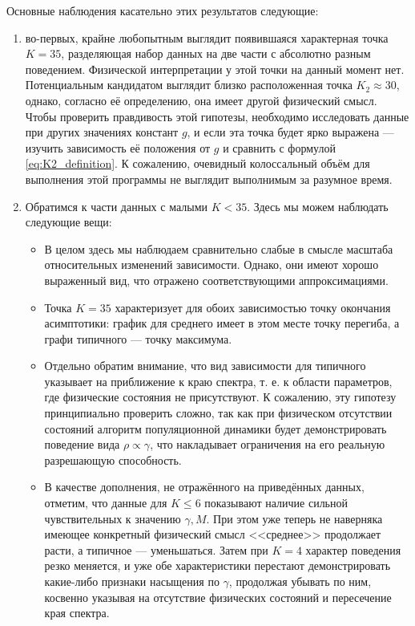 Основные наблюдения касательно этих результатов следующие:
\begin{enumerate}
	\item во-первых, крайне любопытным выглядит появившаяся характерная точка $K = 35$, разделяющая набор данных на две части с абсолютно разным поведением. Физической интерпретации у этой точки на данный момент нет. Потенциальным кандидатом выглядит близко расположенная точка $K_2 \approx 30$, однако, согласно её определению, она имеет другой физический смысл. Чтобы проверить правдивость этой гипотезы, необходимо исследовать данные при других значениях констант $g$, и если эта точка будет ярко выражена --- изучить зависимость её положения от $g$ и сравнить с формулой \eqref{eq:K2_definition}. К сожалению, очевидный колоссальный объём для выполнения этой программы не выглядит выполнимым за разумное время.
	\item Обратимся к части данных с малыми $K < 35$. Здесь мы можем наблюдать следующие вещи:
	\begin{itemize}
		\item В целом здесь мы наблюдаем сравнительно слабые в смысле масштаба относительных изменений зависимости. Однако, они имеют хорошо выраженный вид, что отражено соответствующими аппроксимациями.
		\item Точка $K = 35$ характеризует для обоих зависимостью точку окончания асимптотики: график для среднего имеет в этом месте точку перегиба, а графи типичного --- точку максимума.
		\item Отдельно обратим внимание, что вид зависимости для типичного указывает на приближение к краю спектра, т. е. к области параметров, где физические состояния не присутствуют. К сожалению, эту гипотезу принципиально проверить сложно, так как при физическом отсутствии состояний алгоритм популяционной динамики будет демонстрировать поведение вида $\rho \propto \gamma$, что накладывает ограничения на его реальную разрешающую способность.  
		\item В качестве дополнения, не отражённого на приведённых данных, отметим, что данные для $K \le 6$ показывают наличие сильной чувствительных к значению $\gamma, M$. При этом уже теперь не наверняка имеющее конкретный физический смысл <<среднее>> продолжает расти, а типичное --- уменьшаться. Затем при $K = 4$ характер поведения резко меняется, и уже обе характеристики перестают демонстрировать какие-либо признаки насыщения по $\gamma$, продолжая убывать по ним, косвенно указывая на отсутствие физических состояний и пересечение края спектра.
	\end{itemize}

\end{enumerate}
